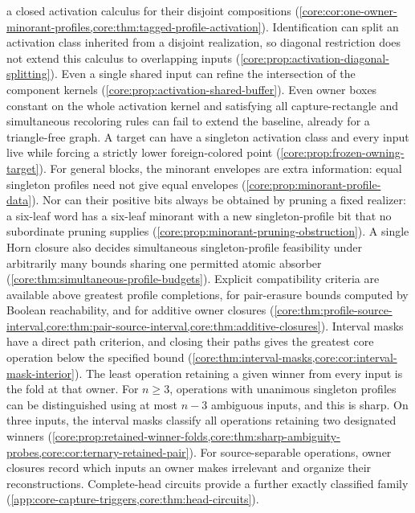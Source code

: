 a closed activation calculus for their disjoint compositions
(\cref{core:cor:one-owner-minorant-profiles,core:thm:tagged-profile-activation}).
Identification can split an activation class inherited from a disjoint
realization, so diagonal restriction does not extend this calculus to
overlapping inputs (\cref{core:prop:activation-diagonal-splitting}).
Even a single shared input can refine the intersection of the component
kernels (\cref{core:prop:activation-shared-buffer}).
Even owner boxes constant on the whole activation kernel and satisfying
all capture-rectangle and simultaneous recoloring rules can fail to
extend the baseline, already for a triangle-free graph. A target can
have a singleton activation class and every input live while forcing
a strictly lower foreign-colored point
(\cref{core:prop:frozen-owning-target}).
For general blocks, the minorant envelopes are extra information:
equal singleton profiles need not give equal envelopes
(\cref{core:prop:minorant-profile-data}). Nor can their positive bits
always be obtained by pruning a fixed realizer: a six-leaf word has a
six-leaf minorant with a new singleton-profile bit that no subordinate
pruning supplies (\cref{core:prop:minorant-pruning-obstruction}).
A single Horn closure also
decides simultaneous singleton-profile feasibility under arbitrarily many bounds sharing one permitted atomic
absorber (\cref{core:thm:simultaneous-profile-budgets}). Explicit compatibility
criteria are available above greatest profile completions, for pair-erasure
bounds computed by Boolean reachability, and for additive owner closures
(\cref{core:thm:profile-source-interval,core:thm:pair-source-interval,core:thm:additive-closures}).
Interval masks have a direct path criterion, and closing their paths gives
the greatest core operation below the specified bound
(\cref{core:thm:interval-masks,core:cor:interval-mask-interior}).
The least operation retaining a given winner from every input is the
fold at that owner. For $n\geq3$, operations with unanimous singleton
profiles can be distinguished using at most $n-3$ ambiguous inputs,
and this is sharp. On three inputs, the interval masks classify all
operations retaining two designated winners
(\cref{core:prop:retained-winner-folds,core:thm:sharp-ambiguity-probes,core:cor:ternary-retained-pair}).
For source-separable operations, owner closures record which inputs an
owner makes irrelevant and organize their reconstructions. Complete-head
circuits provide a further exactly classified family
(\cref{app:core-capture-triggers,core:thm:head-circuits}).

